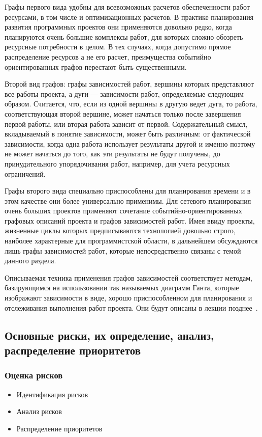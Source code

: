 \documentclass{../industrial-development}
\begin{document}
Графы первого вида удобны для всевозможных расчетов обеспеченности работ ресурсами, в том числе и оптимизационных расчетов. В практике планирования развития программных проектов они применяются довольно редко, когда планируются очень большие комплексы работ, для которых сложно обозреть ресурсные потребности в целом. В тех случаях, когда допустимо прямое распределение ресурсов а не его расчет, преимущества событийно ориентированных графов перестают быть существенными. 

Второй вид графов: графы зависимостей работ, вершины которых представляют все работы проекта, а дуги — зависимости работ, определяемые следующим образом. Считается, что, если из одной вершины в другую ведет дуга, то работа, соответствующая второй вершине, может начаться только после завершения первой работы, или вторая работа зависит от первой. Содержательный смысл, вкладываемый в понятие зависимости, может быть различным: от фактической зависимости, когда одна работа использует результаты другой и именно поэтому не может начаться до того, как эти результаты не будут получены, до принудительного упорядочивания работ, например, для учета ресурсных ограничений.

Графы второго вида специально приспособлены для планирования времени и в этом качестве они более универсально применимы. Для сетевого планирования очень больших проектов применяют сочетание событийно-ориентированных графовых описаний проекта и графов зависимостей работ. Имея ввиду проекты, жизненные циклы которых предписываются технологией довольно строго, наиболее характерные для программистской области, в дальнейшем обсуждаются лишь графы зависимостей работ, которые непосредственно связаны с темой данного раздела. 

Описываемая техника применения графов зависимостей соответствует методам, базирующимся на использовании так называемых диаграмм Ганта, которые изображают зависимости в виде, хорошо приспособленном для планирования и отслеживания выполнения работ проекта. Они будут описаны в лекции позднее~\cite[с.~51]{Skopin}.

\subsection{Основные риски, их определение, анализ, распределение приоритетов}

\begin{frame} \frametitle{Оценка рисков}
	\begin{itemize}
		\item Идентификация рисков
		\item Анализ рисков
		\item Распределение приоритетов
	\end{itemize}
\end{frame}
\end{document}
